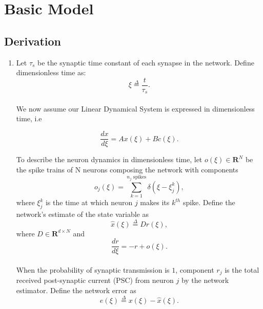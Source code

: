 \section{Basic Model}
\label{section:derivation:basic_model}
\subsection{Derivation}
\begin{enumerate}
    \item Let $\tau_s$ be the synaptic time constant of each synapse in the network. Define dimensionless time as:
    \begin{equation*}
        \xi \overset{\Delta}{=} \frac{t}{\tau_s}.
    \end{equation*}\\
    We now assume our Linear Dynamical System is expressed in dimensionless time, i.e
    
    \begin{equation}
        \label{eq:lds_dimensionless}
        \frac{dx}{d\xi} = Ax(\xi) + B c(\xi).
    \end{equation}
    
    To describe the neuron dynamics in dimensionless time, let $o(\xi) \in \mathbf{R}^{N}$ be the spike trains of N neurons composing the network with components
    \begin{equation*}
        o_j(\xi) = \sum_{k=1}^{\text{$n_j$ spikes}} \delta(\xi - \xi_{j}^{k}),
    \end{equation*}
    where $\xi_j^k$ is the time at which neuron $j$ makes its $k^{th}$ spike. 
    Define the network's estimate of the state variable as
    \begin{equation}
        \label{eq:xhat}
        \hat{x}(\xi)
        \overset{\Delta}{=} D r(\xi), 
    \end{equation}
    where $D \in \mathbf{R}^{d \times N}$ and 
    \begin{equation}
    \label{eq:rdot}
        \frac{dr}{d \xi} = -r + o(\xi).
    \end{equation}\\
    When the probability of synaptic transmission is $1$, component $r_j$ is the total received post-synaptic current (PSC) from neuron $j$ by the network estimator. 
    Define the network error as
    \begin{equation}
    \label{eq:error_def}
        e(\xi) \overset{\Delta}{=} x(\xi) - \hat{x}(\xi).
    \end{equation}
    

\end{enumerate}
